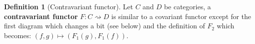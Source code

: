 \documentclass{scrartcl}
\theoremstyle{definition}
\newtheorem{defn}[thm]{Definition}
\theoremstyle{remark}
\begin{document}
\begin{defn}[Contravariant functor]\label{defcontrafunc}
    Let $C$ and $D$ be categories, a \textbf{contravariant functor} $F: C \rightsquigarrow D$ is similar to a covariant functor except for the first diagram which changes a bit (see below) and the definition of $F_2$ which becomes: $(f,g) \mapsto (F_1(g), F_1(f))$.
    \begin{figure}[h]
    \centering
\end{figure}
\end{defn}
\newpage
\end{document}
